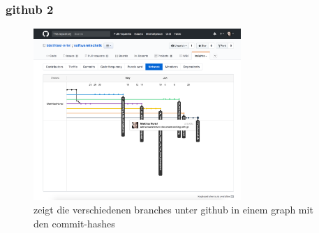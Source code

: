 \documentclass[12pt]{article}
\begin{document}
\subsubsection{github 2}
\begin{figure}[H]
  \centering
  \includegraphics[width=0.7\textwidth]{./img/github_branch_gui-view2.png}
  \captionsetup{name=Abb.,font=footnotesize}
  \caption{zeigt die verschiedenen branches unter github in einem graph mit den commit-hashes}
\end{figure}







\end{document}
